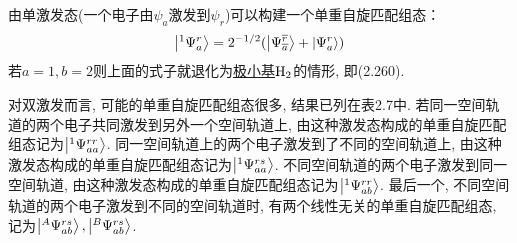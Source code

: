 由单激发态(一个电子由$\psi_a$激发到$\psi_r$)可以构建一个单重自旋匹配组态：
\begin{align}
\Ket{^1\Psi_a^r} = 2^{-1/2}(\Ket{\Psi_{\overline{a}}^{\overline{r}}} + \Ket{\Psi_a^r})
\end{align}
若$a=1,b=2$则上面的式子就退化为\underline{极小基$\mathrm{H}_2$}的情形, 即(2.260).

对双激发而言, 可能的单重自旋匹配组态很多, 结果已列在表2.7中. 若同一空间轨道的两个电子共同激发到另外一个空间轨道上, 由这种激发态构成的单重自旋匹配组态记为$\Ket{^1\Psi_{aa}^{rr}}$. 同一空间轨道上的两个电子激发到了不同的空间轨道上, 由这种激发态构成的单重自旋匹配组态记为$\Ket{^1\Psi_{aa}^{rs}}$. 不同空间轨道的两个电子激发到同一空间轨道, 由这种激发态构成的单重自旋匹配组态记为$\Ket{^1\Psi_{ab}^{rr}}$. 最后一个, 不同空间轨道的两个电子激发到不同的空间轨道时, 有两个线性无关的单重自旋匹配组态, 记为$\Ket{^A\Psi_{ab}^{rs}}, \Ket{^B\Psi_{ab}^{rs}}$.

